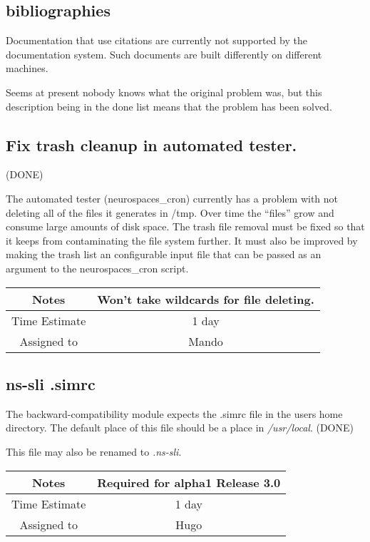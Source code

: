 \documentclass[12pt]{article}
\begin{document}
\subsection{bibliographies}

Documentation that use citations are currently not supported by the
documentation system.  Such documents are built differently on
different machines.

Seems at present nobody knows what the original problem was, but this
description being in the done list means that the problem has been
solved.


\subsection{Fix trash cleanup in automated tester.} (DONE)

The automated tester (neurospaces\_cron) currently has a problem with
not deleting all of the files it generates in /tmp. Over time the
``files'' grow and consume large amounts of disk space. The trash file
removal must be fixed so that it keeps from contaminating the file
system further. It must also be improved by making the trash list an
configurable input file that can be passed as an argument to the
neurospaces\_cron script.

{
  \vspace{5mm}
  \centering
  \begin{tabular}{|c|c|}
    \hline
    Notes
    & Won't take wildcards for file deleting. \\
    \hline
    Time Estimate
    & 1 day \\
    \hline
    Assigned to
    & Mando \\
    \hline
  \end{tabular}
}


\subsection{ns-sli .simrc}

The backward-compatibility module expects the .simrc file in the users
home directory.  The default place of this file should be a place in
{\it /usr/local}. (DONE)

This file may also be renamed to {\it .ns-sli}.

{
  \vspace{5mm}
  \centering
  \begin{tabular}{|c|c|}
    \hline
    Notes
    & Required for alpha1 Release 3.0 \\
    \hline
    Time Estimate
    & 1 day \\
    \hline
    Assigned to
    & Hugo \\
    \hline
  \end{tabular}
}
\end{document}
